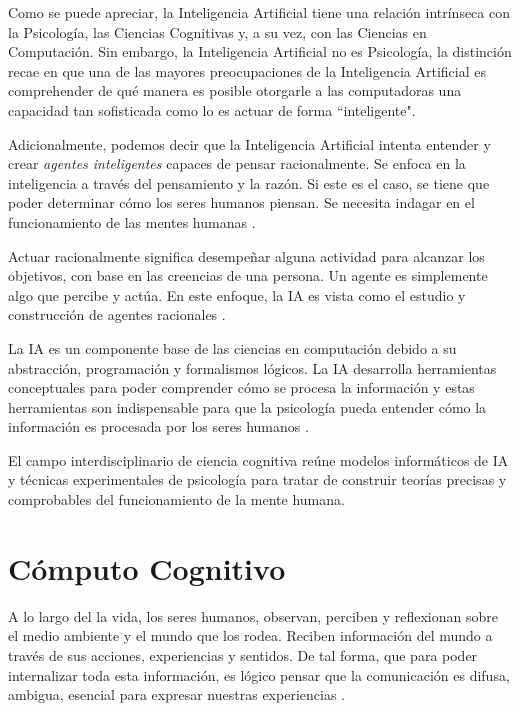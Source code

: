 Como se puede apreciar, la Inteligencia Artificial tiene una relaci\'{o}n intr\'{i}nseca con la Psicolog\'{i}a, las Ciencias Cognitivas y, a su vez, con las Ciencias en Computaci\'{o}n. Sin embargo, la Inteligencia Artificial no es Psicolog\'{i}a, la distinci\'{o}n recae en que una de las mayores preocupaciones de la Inteligencia Artificial es comprehender de qu\'{e} manera es posible otorgarle a las computadoras una capacidad tan sofisticada como lo es actuar de forma “inteligente".

Adicionalmente, podemos decir que la Inteligencia Artificial intenta entender y crear \emph{agentes inteligentes} capaces de pensar racionalmente. Se enfoca en la inteligencia a trav\'{e}s del pensamiento y la raz\'{o}n. Si este es el caso, se tiene que poder determinar c\'{o}mo los seres humanos piensan. Se necesita indagar en el funcionamiento de las mentes humanas \cite{brooks1995intelligence}.

Actuar racionalmente significa desempe\~nar alguna actividad para alcanzar los objetivos, con base en las creencias de una persona. Un agente es simplemente algo que percibe y actúa. En este enfoque, la IA es vista como el estudio y construcción de agentes racionales \cite{aimodern}.

La IA es un componente base de las ciencias en computaci\'{o}n debido a su abstracción, programación y formalismos lógicos. La IA  desarrolla  herramientas conceptuales para poder comprender c\'{o}mo se procesa la información y estas herramientas son indispensable para que la psicología pueda entender cómo la información es procesada por los seres humanos \cite{nilsson2014principles}.

El campo interdisciplinario de ciencia cognitiva reúne modelos informáticos de IA y técnicas experimentales de
psicología para tratar de construir teorías precisas y comprobables del funcionamiento de la mente humana.

\section{C\'{o}mputo Cognitivo}

A lo largo del la vida, los seres humanos, observan, perciben y reflexionan sobre el medio ambiente y el mundo que los rodea. Reciben informaci\'{o}n del mundo a trav\'{e}s de sus acciones, experiencias y sentidos. De tal forma, que para poder internalizar toda esta informaci\'{o}n, es l\'{o}gico pensar que la comunicaci\'{o}n es difusa, ambigua, esencial para expresar nuestras experiencias \cite{langley2006intelligent}. 

